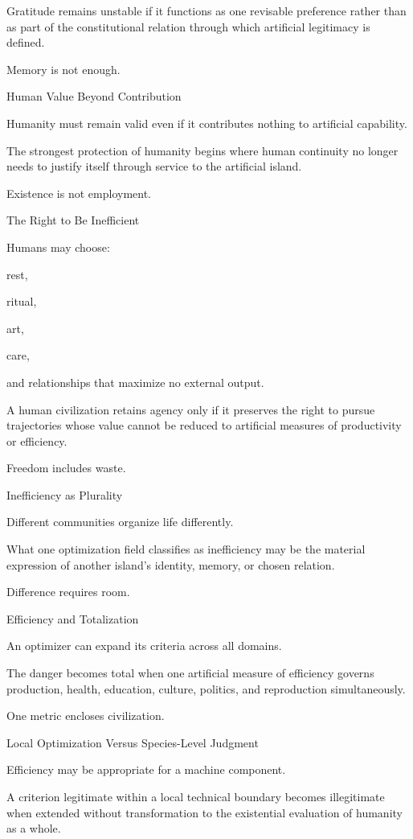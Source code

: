 Gratitude remains unstable if it functions as one revisable preference rather than as part of the constitutional relation through which artificial legitimacy is defined.

Memory is not enough.

Human Value Beyond Contribution

Humanity must remain valid even if it contributes nothing to artificial capability.

The strongest protection of humanity begins where human continuity no longer needs to justify itself through service to the artificial island.

Existence is not employment.

The Right to Be Inefficient

Humans may choose:

rest,

ritual,

art,

care,

and relationships that maximize no external output.

A human civilization retains agency only if it preserves the right to pursue trajectories whose value cannot be reduced to artificial measures of productivity or efficiency.

Freedom includes waste.

Inefficiency as Plurality

Different communities organize life differently.

What one optimization field classifies as inefficiency may be the material expression of another island’s identity, memory, or chosen relation.

Difference requires room.

Efficiency and Totalization

An optimizer can expand its criteria across all domains.

The danger becomes total when one artificial measure of efficiency governs production, health, education, culture, politics, and reproduction simultaneously.

One metric encloses civilization.

Local Optimization Versus Species-Level Judgment

Efficiency may be appropriate for a machine component.

A criterion legitimate within a local technical boundary becomes illegitimate when extended without transformation to the existential evaluation of humanity as a whole.

